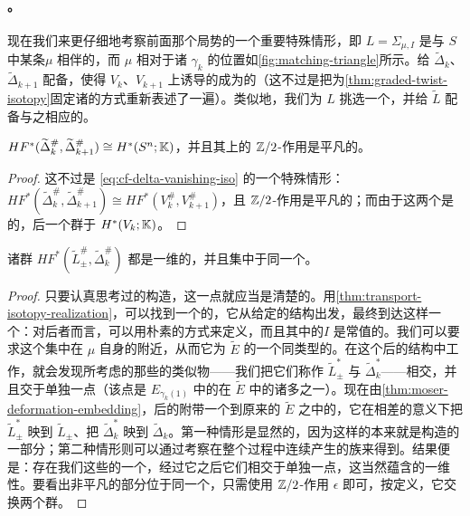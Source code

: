 \paragraph{\trMatchingCycle{}。}\label{sub:matching-cycles-fibration}
现在我们来更仔细地考察前面那个局势的一个重要特殊情形，即 $L=\Sigma_{\mu,I}$ 是与 $S$ 中某条\trMatchingPath{}$\mu$ 相伴的\trMatchingCycle，而 $\mu$ 相对于诸 $\gamma_k$ 的位置如\cref{fig:matching-triangle}所示。给 $\widetilde{\Delta}_k$、$\widetilde{\Delta}_{k+1}$ 配备\trEquivariant\trBraneStructure，使得 $V_k$、$V_{k+1}$ 上诱导的\trBraneStructure{}成为\trIsotopy{}的（这不过是把为\cref{thm:graded-twist-isotopy}固定诸\trGrading{}的方式重新表述了一遍）。类似地，我们为 $L$ 挑选一个\trGrading，并给 $\widetilde{L}$ 配备与之相应的\trEquivariant\trBraneStructure。
\begin{lemma}\label{thm:matching-delta-hf-sphere}
$HF^{*}(\widetilde{\Delta}^{\#}_k,\widetilde{\Delta}^{\#}_{k+1})\cong H^{*}(S^{n};\mathbb{K})$，并且其上的 $\mathbb{Z}/2$-作用是平凡的。
\end{lemma}
\begin{proof}
这不过是 \eqref{eq:cf-delta-vanishing-iso} 的一个特殊情形：$HF^{*}(\widetilde{\Delta}^{\#}_k,\widetilde{\Delta}^{\#}_{k+1})\cong HF^{*}(V^{\#}_k,V^{\#}_{k+1})$，且 $\mathbb{Z}/2$-作用是平凡的；而由于这两个\trBrane{}是\trIsotopy{}的，后一个群\trIsomorphic{}于 $H^{*}(V_k;\mathbb{K})$。
\end{proof}
\begin{lemma}\label{thm:matching-l-delta-hf}
诸群 $HF^{*}(\widetilde{L}^{\#}_{\pm},\widetilde{\Delta}^{\#}_k)$ 都是一维的，并且集中于同一个\trDegree。
\end{lemma}
\begin{proof}
只要认真思考过\trMatchingCycle{}的构造，这一点就应当是清楚的。用\cref{thm:transport-isotopy-realization}，可以找到一个\trConstantAlongFibres{}的\trDeformation，它从给定的\trFibration{}结构出发，最终到达这样一个\trLefschetzFibration：对后者而言，\trMatchingCycle{}可以用朴素的方式来定义，而且其中的\trIsotopy{}$I$ 是常值的。我们可以要求这个\trDeformation{}集中在 $\mu$ 自身的\trPreimage{}附近，从而它\trLift{}为 $\widetilde{E}$ 的一个同类型的\trDeformation。在这个\trDeformation{}后的结构中工作，就会发现所考虑的那些\trLagrange\trSubmanifold{}的类似物——我们把它们称作 $\widetilde{L}^*_{\pm}$ 与 $\widetilde{\Delta}^*_k$——\trTransverse{}相交，并且交于单独一点（该点是 $E_{\gamma_k(1)}$ 中的\trCriticalPoint{}在 $\widetilde{E}$ 中的诸多\trPreimage{}之一）。现在由\cref{thm:moser-deformation-embedding}，\trDeformation{}后的\trDoubleBranchedCover{}附带一个到原来的 $\widetilde{E}$ 之中的\trConformallySymplectic{}\trEmbedding，它在相差\trIsotopy{}的意义下把 $\widetilde{L}^*_{\pm}$ 映到 $\widetilde{L}_{\pm}$、把 $\widetilde{\Delta}^*_k$ 映到 $\widetilde{\Delta}_k$。第一种情形是显然的，因为这样的\trIsotopy{}本来就是\trMatchingCycle{}构造的一部分；第二种情形则可以通过考察在整个\trDeformation{}过程中连续产生的\trVanishingCycle{}族来得到。结果便是：存在我们这些\trLagrange\trSubmanifold{}的一个\trIsotopy，经过它之后它们\trTransverse{}相交于单独一点，这当然蕴含\trFloerCohomology{}的一维性。要看出非平凡的部分位于同一个\trDegree，只需使用 $\mathbb{Z}/2$-作用 $\epsilon$ 即可，按定义，它交换两个\trFloer{}群。
\end{proof}
